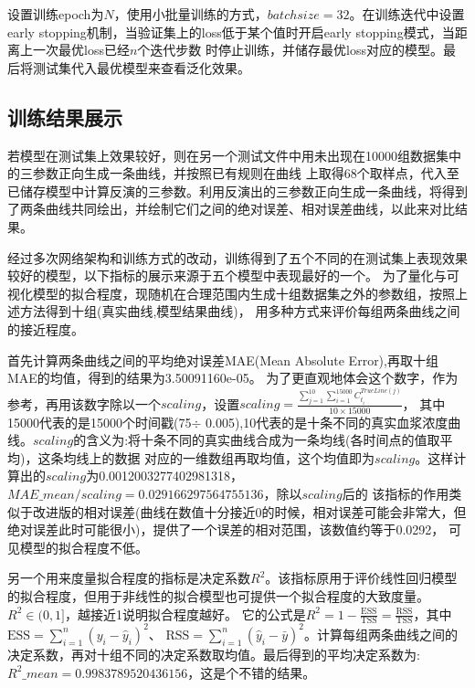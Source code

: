 \documentclass{article}
\begin{document}
设置训练epoch为$N$，使用小批量训练的方式，$batchsize = 32$。在训练迭代中设置early stopping机制，当验证集上的loss低于某个值时开启early stopping模式，当距离上一次最优loss已经$n$个迭代步数
时停止训练，并储存最优loss对应的模型。最后将测试集代入最优模型来查看泛化效果。



\subsection*{训练结果展示}

若模型在测试集上效果较好，则在另一个测试文件中用未出现在10000组数据集中的三参数正向生成一条曲线，并按照已有规则在曲线
上取得68个取样点，代入至已储存模型中计算反演的三参数。利用反演出的三参数正向生成一条曲线，将得到了两条曲线共同绘出，并绘制它们之间的绝对误差、相对误差曲线，以此来对比结果。

经过多次网络架构和训练方式的改动，训练得到了五个不同的在测试集上表现效果较好的模型，以下指标的展示来源于五个模型中表现最好的一个。
为了量化与可视化模型的拟合程度，现随机在合理范围内生成十组数据集之外的参数组，按照上述方法得到十组(真实曲线,模型结果曲线)，
用多种方式来评价每组两条曲线之间的接近程度。

首先计算两条曲线之间的平均绝对误差MAE(Mean Absolute Error),再取十组MAE的均值，得到的结果为3.50091160e-05。
为了更直观地体会这个数字，作为参考，再用该数字除以一个$scaling$，设置$scaling=\frac{\sum_{j = 1}^{10} \sum_{i = 1}^{15000} C^{TrueLine(j)}_{t_{i}}}{10\times15000}  $，
其中15000代表的是15000个时间戳(75$\div$ 0.005),10代表的是十条不同的真实血浆浓度曲线。$scaling$的含义为:将十条不同的真实曲线合成为一条均线(各时间点的值取平均)，这条均线上的数据
对应的一维数组再取均值，这个均值即为$scaling$。这样计算出的$scaling$为0.0012003277402981318，$MAE\_mean/scaling = 0.029166297564755136$，除以$scaling$后的
该指标的作用类似于改进版的相对误差(曲线在数值十分接近0的时候，相对误差可能会非常大，但绝对误差此时可能很小)，提供了一个误差的相对范围，该数值约等于0.0292，
可见模型的拟合程度不低。

另一个用来度量拟合程度的指标是决定系数$R^2$。该指标原用于评价线性回归模型的拟合程度，但用于非线性的拟合模型也可提供一个拟合程度的大致度量。
$R^2\in(0,1]$，越接近1说明拟合程度越好。
它的公式是$ R^2 = 1 - \frac{\text{ESS}}{\text{TSS}} = \frac{\text{RSS}}{\text{TSS}}$，其中$\text{ESS} = \sum_{i=1}^{n} (y_i - \hat{y}_i)^2$、 
$ \text{RSS} = \sum_{i=1}^{n} (\hat{y}_i - \bar{y})^2 $。计算每组两条曲线之间的决定系数，再对十组不同的决定系数取均值。最后得到的平均决定系数为:
$R^2\_mean=0.9983789520436156$，这是个不错的结果。
\end{document}
